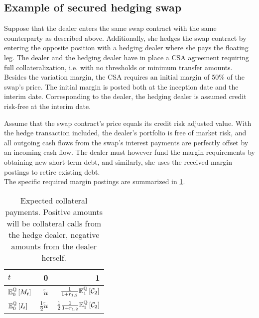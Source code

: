 \documentclass[main.tex]{subfiles}
\begin{document}
    \subsection{Example of secured hedging swap}
        Suppose that the dealer enters the same swap contract with the same counterparty as described above.
        Additionally, she hedges the swap contract by entering the opposite position with a hedging dealer
        where she pays the floating leg.
        The dealer and the hedging dealer have in place a CSA agreement 
        requiring full collateralization, i.e. with no thresholds or minimum transfer amounts.
        Besides the variation margin,
        the CSA requires an initial margin of 50\% of the swap's price.
        The initial margin is posted both at the inception date and the interim date.
        Corresponding to the dealer, the hedging dealer is assumed credit risk-free at the interim date.

        Assume that the swap contract's price equals its credit risk adjusted value.
        With the hedge transaction included,
        the dealer's portfolio is free of market risk,
        and all outgoing cash flows from the swap's interest payments
        are perfectly offset by an incoming cash flow.
        The dealer must however fund the margin requirements by obtaining new short-term debt,
        and similarly, she uses the received margin postings to retire existing debt.
        \\
        The specific required margin postings are summarized in \cref{tbl:swap-margin-postings}.

        \begin{table}[H]
            \centering
            \begin{tabular}{l|rr}
                $t$ & 0 & 1 \\
                \hline
                \rule{0pt}{1.3em}
                $\mathbb{E}_{0}^{\mathbb{Q}}\left[M_t\right]$ & $\tilde{u}$ & $\frac{1}{1+r_{1,2}}\mathbb{E}_{1}^{\mathbb{Q}}\left[\mathcal{C}_{2}\right]$ \\
                \rule{0pt}{1.3em}
                $\mathbb{E}_{0}^{\mathbb{Q}}\left[I_t\right]$ & $\frac{1}{2}\tilde{u}$ & $\frac{1}{2}\frac{1}{1+r_{1,2}}\mathbb{E}_{1}^{\mathbb{Q}}\left[\mathcal{C}_{2}\right]$ \\
            \end{tabular}
            \caption{
                Expected collateral payments. 
                Positive amounts will be collateral calls from the hedge dealer,
                negative amounts from the dealer herself.
            }
            \label{tbl:swap-margin-postings}
        \end{table}
\end{document}
